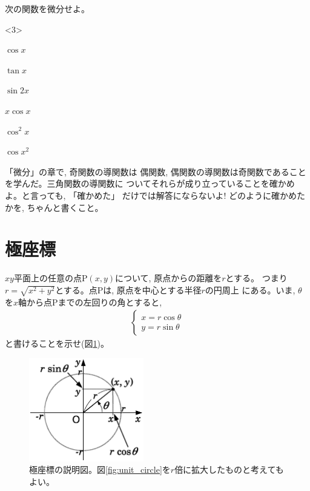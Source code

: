 \begin{q}\label{q:trig_diff0} 次の関数を微分せよ。
\begin{edaenumerate}<3>
\item $\cos x$
\item $\tan x$
\item $\sin 2x$
\item $x \cos x$
\item $\cos^2 x$
\item $\cos x^2$
\end{edaenumerate}\end{q}
\mv

\begin{q}\label{q:trig_symmetry} 「微分」の章で, 奇関数の導関数は
偶関数, 偶関数の導関数は奇関数であることを学んだ。三角関数の導関数に
ついてそれらが成り立っていることを確かめよ。と言っても, 「確かめた」
だけでは解答にならないよ! どのように確かめたかを, ちゃんと書くこと。
\end{q}
\mv


\section{極座標}\label{sect:polar_coord_2D}

\begin{q}\label{q:trig_2Dpolar0} $xy$平面上の任意の点P$(x, y)$について, 原点からの距離を$r$とする。
つまり$r=\sqrt{x^2+y^2}$とする。点Pは, 原点を中心とする半径$r$の円周上
にある。いま, $\theta$を$x$軸から点Pまでの左回りの角とすると, 
\begin{eqnarray}\begin{cases}
x = r \cos \theta\label{eq:2Dpolar}\\
y = r \sin \theta
\end{cases}\end{eqnarray}
と書けることを示せ(図\ref{fig:2D_polar_coordinate})。
\begin{figure}[h]
    \centering
    \includegraphics[width=5cm]{2D_polar_coordinate.eps}
    \caption{極座標の説明図。図\ref{fig:unit_circle}を$r$倍に拡大したものと考えてもよい。}\label{fig:2D_polar_coordinate}
\end{figure}
\end{q}

